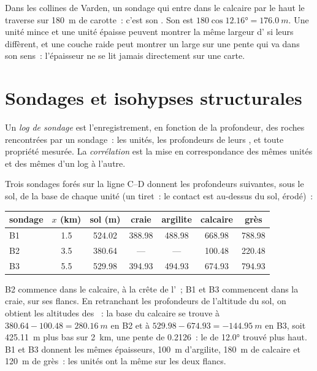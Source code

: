 Dans les collines de Varden, un sondage qui entre dans le calcaire par le haut le traverse sur
\qty{180}{m} de carotte~: c'est son . Son 
est $180\cos\ang{12.16} = \qty{176.0}{m}$. Une unité mince et une unité épaisse
peuvent montrer la même largeur d' si leurs  diffèrent, et
une couche raide peut montrer un large  sur une pente qui va dans son
sens~: l'épaisseur ne se lit jamais directement sur une carte.

\section{Sondages et isohypses structurales}\label{sec:b1:cross-sections:boreholes}

\begin{definition}\label{def:b1:cross-sections:log}
Un \emph{log de sondage} est l'enregistrement, en fonction de la profondeur, des roches
rencontrées par un sondage~: les unités, les profondeurs de leurs , et
toute propriété mesurée. La \emph{corrélation} est la mise en correspondance des mêmes
unités et des mêmes  d'un log à l'autre.
\end{definition}

Trois sondages forés sur la ligne C--D donnent les profondeurs suivantes, sous le
sol, de la base de chaque unité (un tiret~: le contact est au-dessus du sol,
érodé)~:
\begin{center}
\small
\begin{tabular}{lcccccc}
\hline
sondage & $x$ (km) & sol (m) & craie & argilite & calcaire & grès \\
\hline
B1 & 1.5 & 524.02 & 388.98 & 488.98 & 668.98 & 788.98 \\
B2 & 3.5 & 380.64 & --- & --- & 100.48 & 220.48 \\
B3 & 5.5 & 529.98 & 394.93 & 494.93 & 674.93 & 794.93 \\
\hline
\end{tabular}
\end{center}
B2 commence dans le calcaire, à la crête de l'~; B1 et B3 commencent
dans la craie, sur ses flancs. En retranchant les profondeurs de l'altitude du
sol, on obtient les altitudes des ~: la base du calcaire se trouve à
$380.64 - 100.48 = \qty{280.16}{m}$ en B2 et à $529.98 - 674.93 =
\qty{-144.95}{m}$ en B3, soit \qty{425.11}{m} plus bas sur \qty{2}{km}, une pente
de \num{0.2126}~: le  de \ang{12.0} trouvé plus haut. B1 et B3
donnent les mêmes épaisseurs, \qty{100}{m} d'argilite, \qty{180}{m} de calcaire et
\qty{120}{m} de grès~: les unités ont la même  sur les deux
flancs.

